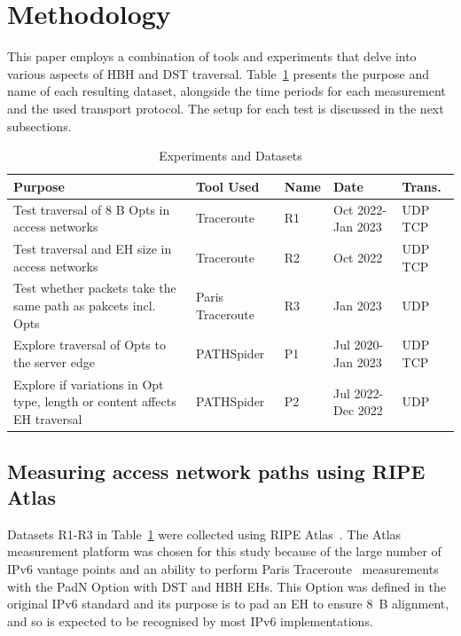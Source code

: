 \documentclass[conference]{IEEEtran}
\begin{document}
\section{Methodology} 
\label{sec:methodology}

This paper employs a combination of tools and experiments that
delve into various aspects of HBH and DST traversal. Table~\ref{tbl:datasets} presents the purpose and name of each resulting dataset, alongside the time periods for each measurement and the used transport protocol. The setup for each test is discussed in the next subsections.


\begin{table}
\begin{tabular}{p{}|p{}|p{}|p{}|p{}}
Purpose                                                                          & Tool Used        & Name & Date               & Trans. \\
\hline
Test traversal of 8 B Opts in access networks                                  & Traceroute       & R1           & Oct 2022- Jan 2023 & UDP TCP          \\
\hline
Test traversal and EH size in access networks                                & Traceroute       & R2           & Oct 2022           & UDP TCP          \\
\hline
Test whether packets take the same path as pakcets incl. Opts & Paris Traceroute & R3           & Jan 2023           & UDP               \\
\hline
Explore traversal of Opts to the server edge                              & PATHSpider       & P1           & Jul 2020- Jan 2023 & UDP TCP          \\
\hline
Explore if variations in Opt type, length or content affects EH traversal   & PATHSpider       & P2           & Jul 2022- Dec 2022     & UDP              
\end{tabular}
  \caption{Experiments and Datasets}
  \label{tbl:datasets}
\end{table}


    
\subsection{Measuring access network paths using RIPE Atlas}
\label{sec:ripe-methodology}

Datasets R1-R3 in Table~\ref{tbl:datasets} were collected using RIPE Atlas~\cite{bajpai2015lessons}.
The Atlas measurement platform was chosen for this study because of the large number of IPv6 vantage points and an ability to perform Paris Traceroute~\cite{augustin2006avoiding} measurements with the PadN Option with DST and HBH EHs. This Option was defined in the original IPv6 standard and its purpose is to pad an EH to ensure 8~B alignment, and so is expected to be recognised by most IPv6 implementations.
\end{document}
